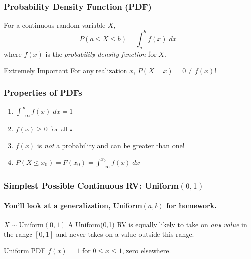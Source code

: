 \documentclass[handout]{beamer}
\begin{document}
\begin{frame}
\frametitle{Probability Density Function (PDF)}
For a continuous random variable $X$, 
	$$P(a \leq X \leq b) = \int_a^b f(x) \; dx$$
where $f(x)$ is the \emph{probability density function} for $X$. 
\vspace{2em}

\begin{alertblock}{Extremely Important}
For any realization $x$, $P(X=x) = 0 \neq f(x)$!
\end{alertblock}
\end{frame}
\begin{frame}
\frametitle{Properties of PDFs}
\begin{enumerate}
\item $\int_{-\infty}^\infty f(x) \; dx = 1$ 
\item $f(x) \geq 0$ for all $x$
\item $f(x)$ is \emph{not} a probability and can be greater than one!
\item $P(X\leq x_0) = F(x_0) = \int_{-\infty}^{x_0} f(x) \; dx $
\end{enumerate}
\end{frame}
\begin{frame}
\frametitle{Simplest Possible Continuous RV: Uniform$(0,1)$}
\framesubtitle{You'll look at a generalization, Uniform$(a,b)$ for homework.}

\begin{block}{$X \sim \mbox{Uniform}(0,1)$}
A Uniform(0,1) RV is equally likely to take on \emph{any value} in the range $[0,1]$ and never takes on a value outside this range.
\end{block}

\begin{block}{Uniform PDF}
$f(x) = 1$ for $0\leq x \leq 1$, zero elsewhere.
\end{block}

\end{frame}
\end{document}
